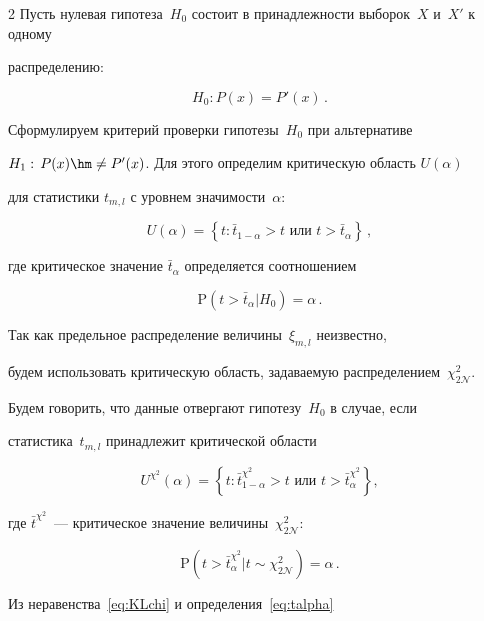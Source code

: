 \begin{multicols}{2}
Пусть нулевая гипотеза~$H_0$ состоит в принадлежности выборок~$X$ и~$X'$ к одному

распределению:

$$

H_0: P(x) = P'(x)\,.

$$

Сформулируем критерий проверки гипотезы~$H_0$ при альтернативе

$H_1:\,P(x) \hm\neq P'(x)$. Для этого определим критическую область $U(\alpha)$

для статистики $t_{m,l}$ с уровнем значимости~$\alpha$:

 $$

 U(\alpha) = \left\{t: \bar{t}_{1 -\alpha} > t \mbox{~или~} t > \bar{t}_{\alpha}\right\}\,,

 $$

 где критическое значение $\bar{t}_{\alpha}$ определяется соотношением

 \begin{equation}

 \label{eq:talpha}

 \mathrm{P}(t > \bar{t}_{\alpha}| H_0) = \alpha\,.

 \end{equation}

 Так как предельное распределение величины~$\xi_{m,l}$ неизвестно,

 будем использовать критическую область, задаваемую распределением~$\chi_{2\mathcal{N}}^2$.

 Будем говорить, что данные отвергают гипотезу~$H_0$ в случае, если

 статистика~$t_{m,l}$ принадлежит критической области

 \begin{equation}

 \label{eq:Uchi2}

U^{\chi^2}(\alpha) = \left\{

t: \bar{t}^{\chi^2}_{1 -\alpha} > t \mbox{~или~} t > \bar{t}^{\chi^2}_{\alpha}\right\},

\end{equation}

где $\bar{t}^{\chi^2}$~---  критическое значение величины~$\chi_{2\mathcal{N}}^2$:

 $$

 \mathrm{P}(t > \bar{t}^{\chi^2}_{\alpha}| t\sim\chi^2_{2\mathcal{N}}) = \alpha\,.

 $$

  Из неравенства~\eqref{eq:KLchi} и определения~\eqref{eq:talpha}


\end{multicols}
